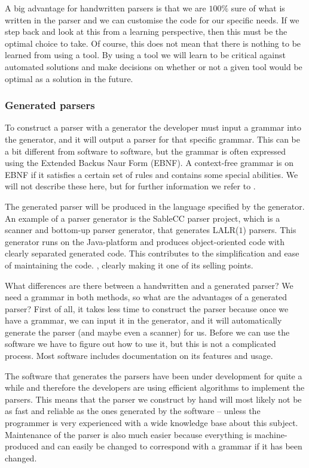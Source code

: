 A big advantage for handwritten parsers is that we are $100 \%$ sure
of what is written in the parser and we can customise the code for
our specific needs. If we step back and look at this from a learning
perspective, then this must be the optimal choice to take. Of course,
this does not mean that there is nothing to be learned from using a
tool. By using a tool we will learn to be critical against automated
solutions and make decisions on whether or not a given tool would be
optimal as a solution in the future.

\subsubsection{Generated parsers}
\label{subsec:generatedparsers}
To construct a parser with a generator the developer must input a grammar into
the generator, and it will output a parser for that specific grammar. This can
be a bit different from software to software, but the grammar is often expressed
using the Extended Backus Naur Form (EBNF). A context-free grammar is on EBNF if
it satisfies a certain set of rules and contains some special abilities. We will
not describe these here, but for further information we refer to
\cite{fischer2009}.

The generated parser will be produced in the language specified
by the generator. An example of a parser generator is the SableCC
parser project, which is a scanner and bottom-up parser generator,
that generates LALR($1$) parsers. This generator runs on the
Java-platform and produces object-oriented code with clearly separated
generated code. This contributes to
the simplification and ease of maintaining the code. \cite[p.
11]{sableccdoc}, clearly making it one of its selling points.

What differences are there between a handwritten and a generated parser?
We need a grammar in both methods, so what are the advantages of a
generated parser? First of all, it takes less time to construct the
parser because once we have a grammar, we can input it in the generator,
and it will automatically generate the parser (and maybe even a scanner)
for us. Before we can use the software we have to figure out how to
use it, but this is not a complicated process. Most software includes
documentation on its features and usage.

The software that generates the parsers have been under development for quite a
while and therefore the developers are using efficient algorithms to implement
the parsers. This means that the parser we construct by hand will most likely
not be as fast and reliable as the ones generated by the software -- unless the
programmer is very experienced with a wide knowledge base about this subject.
Maintenance of the parser is also much easier because everything is
machine-produced and can easily be changed to correspond with a grammar if it
has been changed.

